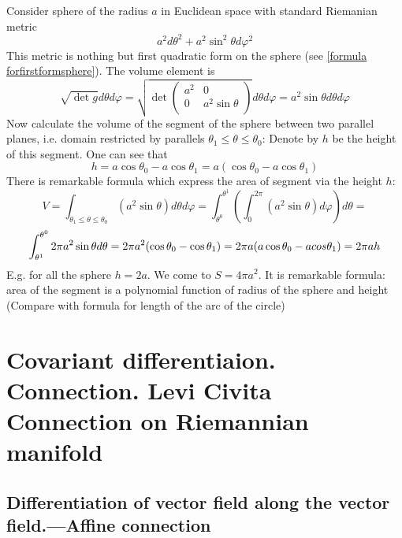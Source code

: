 \documentclass[12pt]{article}
\theoremstyle{theorem}
\numberwithin{equation}{section}
\begin{document}
    Consider sphere of the radius $a$ in Euclidean space with standard Riemanian metric
                       $$
            a^2 d\theta^2+a^2\sin^2\theta d\varphi^2
                       $$
  This metric is nothing but first quadratic form   on the sphere (see \eqref{formula forfirstformsphere}).
   The volume element is
                             $$
           \sqrt {\det g}d\theta  d\varphi=
         \sqrt
           {
         \det
         \left(
    \begin{array}{cc}
  a^2 & 0 \\
  0&  a^2\sin \theta \\
\end{array}
\right)}d\theta d\varphi=a^2\sin \theta d\theta d\varphi
                             $$
 Now calculate the volume of the segment of the sphere between two parallel planes,
 i.e. domain restricted  by parallels $\theta_1\leq \theta \leq \theta_0$:
   Denote by  $h$ be the height of this segment. One can see that
                 $$
               h=a\cos\theta_0-a\cos\theta_1=a(\cos\theta_0-a\cos \theta_1)
                $$
   There is remarkable formula which express the area of segment via the height $h$:
       $$
   V= \int_{\theta_1\leq \theta \leq \theta_0}\left (a^2\sin \theta \right)d\theta d\varphi=
         \int_{\theta^0}^{\theta^1}\left(\int_0^{2\pi}\left(a^2\sin \theta\right) d\varphi\right)d\theta=
                $$
\begin{equation}\label{areaoftheseqment}
       \int_{\theta^1}^{\theta^0} 2\pi a^2\sin\theta d\theta=2\pi a^2 (\cos \theta_0-\cos\theta_1)=
            2\pi a (a\cos \theta_0-a\\cos \theta_1)=2\pi a h
\end{equation}
 E.g. for all the sphere $h=2a$. We come to $S=4\pi a^2$.
It is remarkable formula: area of the segment is a polynomial function of radius of the sphere
 and height (Compare with formula for length of the arc of the circle)


\section {Covariant differentiaion. Connection. Levi Civita  Connection on Riemannian manifold}

\subsection {Differentiation of vector field along the vector field.---Affine connection}
\end{document}
